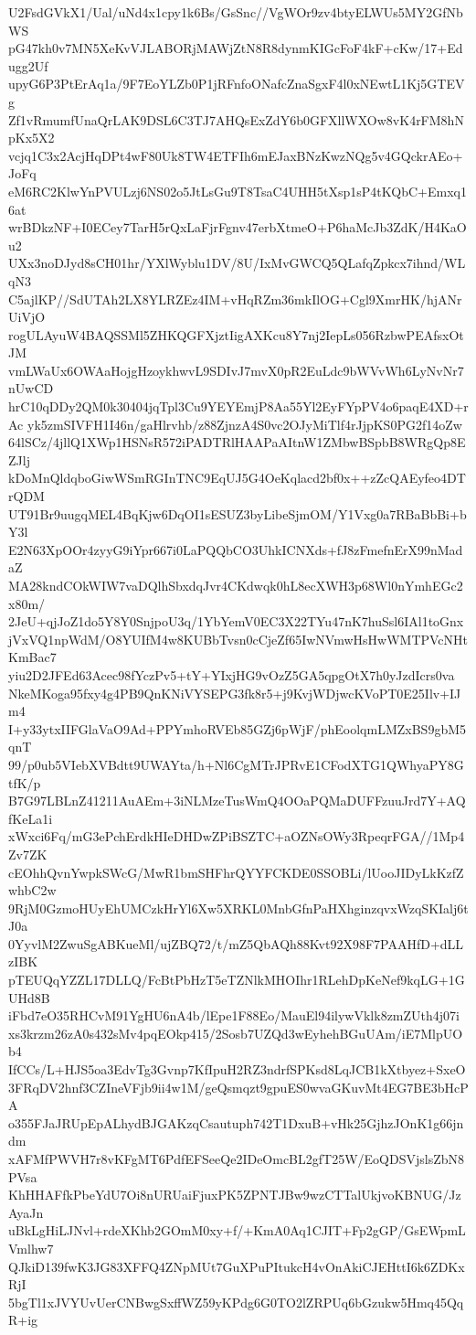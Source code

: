 U2FsdGVkX1/Ual/uNd4x1cpy1k6Bs/GsSnc//VgWOr9zv4btyELWUs5MY2GfNbWS
pG47kh0v7MN5XeKvVJLABORjMAWjZtN8R8dynmKIGcFoF4kF+cKw/17+Edugg2Uf
upyG6P3PtErAq1a/9F7EoYLZb0P1jRFnfoONafcZnaSgxF4l0xNEwtL1Kj5GTEVg
Zf1vRmumfUnaQrLAK9DSL6C3TJ7AHQsExZdY6b0GFXllWXOw8vK4rFM8hNpKx5X2
vcjq1C3x2AcjHqDPt4wF80Uk8TW4ETFIh6mEJaxBNzKwzNQg5v4GQckrAEo+JoFq
eM6RC2KlwYnPVULzj6NS02o5JtLsGu9T8TsaC4UHH5tXsp1sP4tKQbC+Emxq16at
wrBDkzNF+I0ECey7TarH5rQxLaFjrFgnv47erbXtmeO+P6haMcJb3ZdK/H4KaOu2
UXx3noDJyd8sCH01hr/YXlWyblu1DV/8U/IxMvGWCQ5QLafqZpkcx7ihnd/WLqN3
C5ajlKP//SdUTAh2LX8YLRZEz4IM+vHqRZm36mkIlOG+Cgl9XmrHK/hjANrUiVjO
rogULAyuW4BAQSSMl5ZHKQGFXjztIigAXKcu8Y7nj2IepLs056RzbwPEAfsxOtJM
vmLWaUx6OWAaHojgHzoykhwvL9SDIvJ7mvX0pR2EuLdc9bWVvWh6LyNvNr7nUwCD
hrC10qDDy2QM0k30404jqTpl3Cu9YEYEmjP8Aa55Yl2EyFYpPV4o6paqE4XD+rAc
yk5zmSIVFH1I46n/gaHlrvhb/z88ZjnzA4S0vc2OJyMiTlf4rJjpKS0PG2f14oZw
64lSCz/4jllQ1XWp1HSNsR572iPADTRlHAAPaAItnW1ZMbwBSpbB8WRgQp8EZJlj
kDoMnQldqboGiwWSmRGInTNC9EqUJ5G4OeKqlacd2bf0x++zZcQAEyfeo4DTrQDM
UT91Br9uugqMEL4BqKjw6DqOI1sESUZ3byLibeSjmOM/Y1Vxg0a7RBaBbBi+bY3l
E2N63XpOOr4zyyG9iYpr667i0LaPQQbCO3UhkICNXds+fJ8zFmefnErX99nMadaZ
MA28kndCOkWIW7vaDQlhSbxdqJvr4CKdwqk0hL8ecXWH3p68Wl0nYmhEGc2x80m/
2JeU+qjJoZ1do5Y8Y0SnjpoU3q/1YbYemV0EC3X22TYu47nK7huSsl6IAl1toGnx
jVxVQ1npWdM/O8YUIfM4w8KUBbTvsn0cCjeZf65IwNVmwHsHwWMTPVcNHtKmBac7
yiu2D2JFEd63Acec98fYczPv5+tY+YIxjHG9vOzZ5GA5qpgOtX7h0yJzdIcrs0va
NkeMKoga95fxy4g4PB9QnKNiVYSEPG3fk8r5+j9KvjWDjwcKVoPT0E25Ilv+IJm4
I+y33ytxIIFGlaVaO9Ad+PPYmhoRVEb85GZj6pWjF/phEoolqmLMZxBS9gbM5qnT
99/p0ub5VIebXVBdtt9UWAYta/h+Nl6CgMTrJPRvE1CFodXTG1QWhyaPY8GtfK/p
B7G97LBLnZ41211AuAEm+3iNLMzeTusWmQ4OOaPQMaDUFFzuuJrd7Y+AQfKeLa1i
xWxci6Fq/mG3ePchErdkHIeDHDwZPiBSZTC+aOZNsOWy3RpeqrFGA//1Mp4Zv7ZK
cEOhhQvnYwpkSWcG/MwR1bmSHFhrQYYFCKDE0SSOBLi/lUooJIDyLkKzfZwhbC2w
9RjM0GzmoHUyEhUMCzkHrYl6Xw5XRKL0MnbGfnPaHXhginzqvxWzqSKIalj6tJ0a
0YyvlM2ZwuSgABKueMl/ujZBQ72/t/mZ5QbAQh88Kvt92X98F7PAAHfD+dLLzIBK
pTEUQqYZZL17DLLQ/FcBtPbHzT5eTZNlkMHOIhr1RLehDpKeNef9kqLG+1GUHd8B
iFbd7eO35RHCvM91YgHU6nA4b/lEpe1F88Eo/MauEl94ilywVklk8zmZUth4j07i
xs3krzm26zA0s432sMv4pqEOkp415/2Sosb7UZQd3wEyhehBGuUAm/iE7MlpUOb4
IfCCs/L+HJS5oa3EdvTg3Gvnp7KfIpuH2RZ3ndrfSPKsd8LqJCB1kXtbyez+SxeO
3FRqDV2hnf3CZIneVFjb9ii4w1M/geQsmqzt9gpuES0wvaGKuvMt4EG7BE3bHcPA
o355FJaJRUpEpALhydBJGAKzqCsautuph742T1DxuB+vHk25GjhzJOnK1g66jndm
xAFMfPWVH7r8vKFgMT6PdfEFSeeQe2IDeOmcBL2gfT25W/EoQDSVjslsZbN8PVsa
KhHHAFfkPbeYdU7Oi8nURUaiFjuxPK5ZPNTJBw9wzCTTalUkjvoKBNUG/JzAyaJn
uBkLgHiLJNvl+rdeXKhb2GOmM0xy+f/+KmA0Aq1CJIT+Fp2gGP/GsEWpmLVmlhw7
QJkiD139fwK3JG83XFFQ4ZNpMUt7GuXPuPItukcH4vOnAkiCJEHttI6k6ZDKxRjI
5bgTl1xJVYUvUerCNBwgSxffWZ59yKPdg6G0TO2lZRPUq6bGzukw5Hmq45QqR+ig
